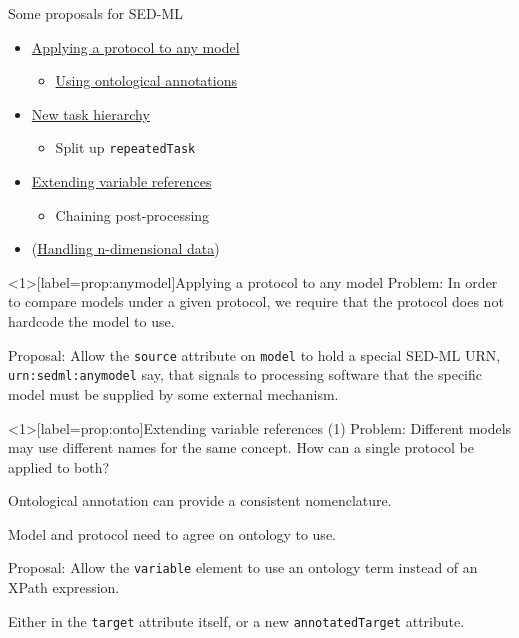 \documentclass[t,xcolor={usenames,dvipsnames}]{beamer}
\newcommand{\sedml}[1]{\lstinline[basicstyle=\color{blue}]!#1!}
\newcommand{\subitem}[1]{\begin{itemize}[<.->]\item #1 \end{itemize}}
\begin{document}
\begin{frame}{Some proposals for SED-ML}
\begin{itemize}
\item \hyperlink{prop:anymodel}{Applying a protocol to any model}
  \subitem{\hyperlink{prop:onto}{Using ontological annotations}}
\item \hyperlink{prop:tasks}{New task hierarchy}
  \subitem{Split up \sedml{repeatedTask}}
\item \hyperlink{prop:varref}{Extending variable references}
  \subitem{Chaining post-processing}
\item (\hyperlink{prop:nd}{Handling n-dimensional data})
\end{itemize}
\end{frame}


\begin{frame}<1>[label=prop:anymodel]{Applying a protocol to any model}
\alert{Problem}:
 In order to compare models under a given protocol, we require that
 the protocol does not hardcode the model to use.

\alert{Proposal}:
 Allow the \sedml{source} attribute on \sedml{model} to hold a special
 SED-ML URN, \sedml{urn:sedml:anymodel} say, that signals to
 processing software that the specific model must be supplied by some
 external mechanism.
\end{frame}


\begin{frame}<1>[label=prop:onto]{Extending variable references (1)}
\alert{Problem}:
 Different models may use different names for the same concept.  How
 can a single protocol be applied to both?

 \alert{Ontological annotation} can provide a consistent nomenclature.

 Model and protocol need to agree on ontology to use.

\alert{Proposal}:
 Allow the \sedml{variable} element to use an ontology term instead of
 an XPath expression.

 Either in the \sedml{target} attribute itself, or a new
 \sedml{annotatedTarget} attribute.
\end{frame}

\end{document}
